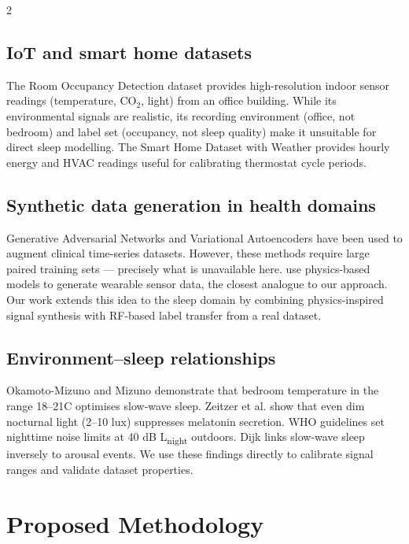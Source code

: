 \documentclass[11pt,a4paper]{article}
\begin{document}
\begin{multicols}{2}
\subsection{IoT and smart home datasets}
The Room Occupancy Detection dataset \cite{kaggle_occupancy} provides
high-resolution indoor sensor readings (temperature, CO$_2$, light) from an
office building.  While its environmental signals are realistic, its recording
environment (office, not bedroom) and label set (occupancy, not sleep quality)
make it unsuitable for direct sleep modelling.  The Smart Home Dataset with
Weather \cite{kaggle_smarthome} provides hourly energy and HVAC readings
useful for calibrating thermostat cycle periods.

\subsection{Synthetic data generation in health domains}
Generative Adversarial Networks \cite{goodfellow2014generative} and Variational
Autoencoders \cite{kingma2014auto} have been used to augment clinical time-series
datasets.  However, these methods require large paired training sets — precisely
what is unavailable here.  \citet{chen2021synthetic} use physics-based models
to generate wearable sensor data, the closest analogue to our approach.  Our
work extends this idea to the sleep domain by combining physics-inspired signal
synthesis with RF-based label transfer from a real dataset.

\subsection{Environment–sleep relationships}
Okamoto-Mizuno and Mizuno \cite{okamoto2012thermal} demonstrate that bedroom
temperature in the range 18–21\textdegree{}C optimises slow-wave sleep.
Zeitzer et al. \cite{zeitzer2000sensitivity} show that even dim nocturnal light
(2–10 lux) suppresses melatonin secretion.  WHO guidelines \cite{who2009noise}
set nighttime noise limits at 40 dB L\textsubscript{night} outdoors.
Dijk \cite{dijk2009regulation} links slow-wave sleep inversely to arousal
events.  We use these findings directly to calibrate signal ranges and
validate dataset properties.

\section{Proposed Methodology}


\end{multicols}
\end{document}

